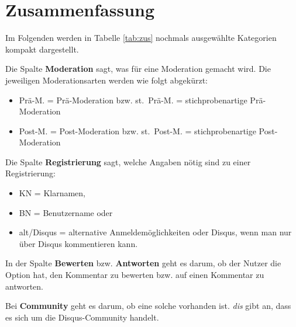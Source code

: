 \section{Zusammenfassung}

Im Folgenden werden in Tabelle \ref{tab:zus} nochmals ausgewählte Kategorien kompakt dargestellt.

Die Spalte {\bfseries Moderation} sagt, was für eine Moderation gemacht wird.
Die jeweiligen Moderationsarten werden wie folgt abgekürzt:
\begin{itemize}
  \item Prä-M. = Prä-Moderation bzw. st.~Prä-M. = stichprobenartige Prä-Moderation
  \item Post-M. = Post-Moderation bzw. st.~Post-M. = stichprobenartige Post-Moderation
\end{itemize}

Die Spalte {\bfseries Registrierung} sagt, welche Angaben nötig sind zu einer Registrierung:

\begin{itemize}
  \item KN = Klarnamen,
  \item BN = Benutzername oder
  \item alt/Disqus = alternative Anmeldemöglichkeiten oder Disqus, wenn man nur über Disqus kommentieren kann.
\end{itemize}

In der Spalte {\bfseries Bewerten} bzw. {\bfseries Antworten} geht es darum, ob der Nutzer die Option hat, den Kommentar
zu bewerten bzw. auf einen Kommentar zu antworten.

Bei {\bfseries Community} geht es darum, ob eine solche vorhanden ist. \emph{dis} gibt an, dass es sich um die
Disqus-Community handelt.


